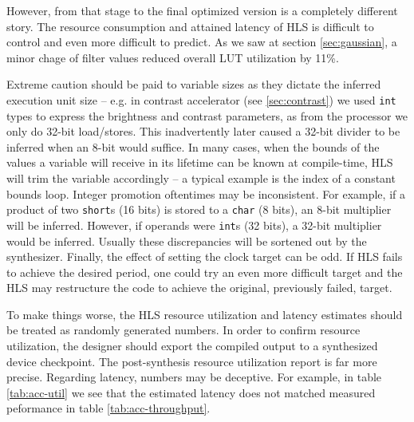 However, from that stage to the final optimized version is a completely different story.
The resource consumption and attained latency of HLS is difficult to control and even more difficult to predict.
As we saw at section \ref{sec:gaussian}, a minor chage of filter values reduced overall LUT utilization by 11\%.

Extreme caution should be paid to variable sizes as they dictate the inferred execution unit size -- e.g.
in contrast accelerator (see \ref{sec:contrast}) we used \texttt{int} types to express the brightness and contrast parameters, 
as from the processor we only do 32-bit load/stores.
This inadvertently later caused a 32-bit divider to be inferred when an 8-bit would suffice. In many cases, when the bounds of the values
a variable will receive in its lifetime can be known at compile-time, HLS will trim the variable accordingly -- a typical example
is the index of a constant bounds loop. Integer promotion oftentimes may be inconsistent.
For example, if a product of two \texttt{short}s (16 bits) is stored to a \texttt{char} (8 bits), an 8-bit multiplier will be inferred.
However, if operands were \texttt{int}s (32 bits), a 32-bit multiplier would be inferred. Usually these discrepancies will be sortened out
by the synthesizer. Finally, the effect of setting the clock target can be odd. If HLS fails to achieve the desired period,
one could try an even more difficult target and the HLS may restructure the code to achieve the original, previously failed, target.

To make things worse, the HLS resource utilization and latency estimates should be treated as randomly generated numbers.
In order to confirm resource utilization, the designer should export the compiled output to a synthesized device checkpoint.
The post-synthesis resource utilization report is far more precise. Regarding latency, numbers may be deceptive. For example,
in table \ref{tab:acc-util} we see that the estimated latency does not matched measured peformance in table \ref{tab:acc-throughput}.


